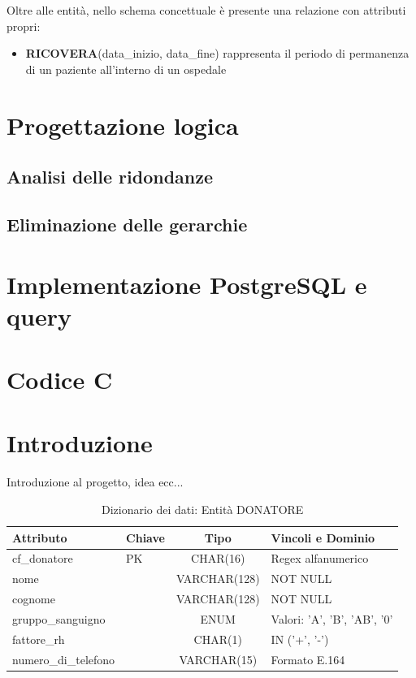 \documentclass[10pt, a4paper]{article}
\begin{document}
Oltre alle entità, nello schema concettuale è presente una relazione con attributi propri:
\begin{itemize}
    \item \textbf{RICOVERA}(data\_inizio, data\_fine) rappresenta il periodo di permanenza di un paziente all'interno di un ospedale
\end{itemize}


\section{Progettazione logica}
\subsection{Analisi delle ridondanze}
\subsection{Eliminazione delle gerarchie}

\section{Implementazione PostgreSQL e query}
\section{Codice C}














\section{Introduzione}
\label{sec:introduzione}
Introduzione al progetto, idea ecc...

\begin{table}[h]
\centering
\begin{tabular}{llcl}
\toprule
\textbf{Attributo} & \textbf{Chiave} & \textbf{Tipo} & \textbf{Vincoli e Dominio} \\
\midrule
cf\_donatore & PK & CHAR(16) &  Regex alfanumerico \\
nome            && VARCHAR(128) & NOT NULL \\
cognome          & & VARCHAR(128) & NOT NULL \\
gruppo\_sanguigno & & ENUM         & Valori: 'A', 'B', 'AB', '0' \\
fattore\_rh       & & CHAR(1)      & IN ('+', '-') \\
numero\_di\_telefono & & VARCHAR(15)  & Formato E.164 \\
\bottomrule
\end{tabular}
\caption{Dizionario dei dati: Entità DONATORE}
\end{table}
\end{document}

